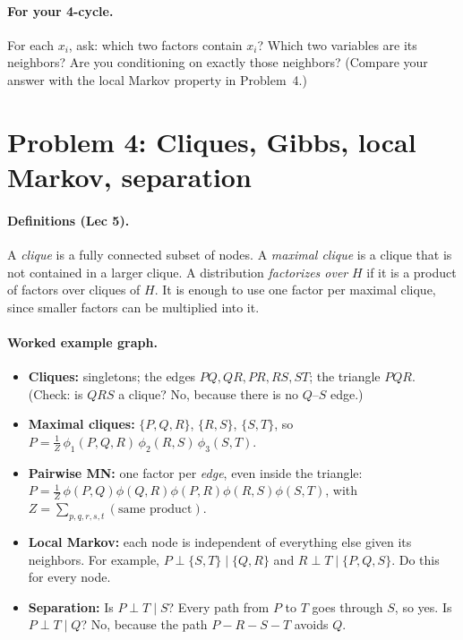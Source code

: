 \documentclass[11pt]{article}
\newcommand{\indep}{\perp}
\begin{document}
\paragraph{For your 4-cycle.} For each $x_i$, ask: which two factors contain
$x_i$? Which two variables are its neighbors? Are you conditioning on
exactly those neighbors? (Compare your answer with the local Markov
property in Problem~4.)

\section*{Problem 4: Cliques, Gibbs, local Markov, separation}

\paragraph{Definitions (Lec 5).} A \emph{clique} is a fully connected
subset of nodes. A \emph{maximal clique} is a clique that is not contained
in a larger clique. A distribution \emph{factorizes over} $H$ if it is a
product of factors over cliques of $H$. It is enough to use one factor per
maximal clique, since smaller factors can be multiplied into it.

\paragraph{Worked example graph.}
\begin{center}
\end{center}
\begin{itemize}
  \item \textbf{Cliques:} singletons; the edges $PQ, QR, PR, RS, ST$; the
        triangle $PQR$. (Check: is $QRS$ a clique? No, because there is no
        $Q$--$S$ edge.)
  \item \textbf{Maximal cliques:} $\{P,Q,R\}$, $\{R,S\}$, $\{S,T\}$, so
        $P = \tfrac1Z\,\phi_1(P,Q,R)\,\phi_2(R,S)\,\phi_3(S,T)$.
  \item \textbf{Pairwise MN:} one factor per \emph{edge}, even inside the
        triangle:
        $P = \tfrac1Z\,\phi(P,Q)\phi(Q,R)\phi(P,R)\phi(R,S)\phi(S,T)$,
        with $Z = \sum_{p,q,r,s,t}(\text{same product})$.
  \item \textbf{Local Markov:} each node is independent of everything else
        given its neighbors. For example,
        $P \indep \{S,T\} \mid \{Q,R\}$ and
        $R \indep T \mid \{P,Q,S\}$. Do this for every node.
  \item \textbf{Separation:} Is $P \indep T \mid S$? Every path from $P$
        to $T$ goes through $S$, so yes. Is $P \indep T \mid Q$? No, because
        the path $P - R - S - T$ avoids $Q$.
\end{itemize}
\end{document}
